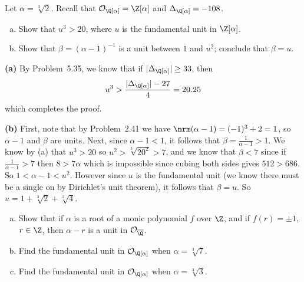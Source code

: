 \documentclass[11pt,letterpaper]{article}
\begin{document}
\begin{cproblem}{5.36}
    Let $\alpha=\sqrt[3]{2}$. Recall that $\mathcal{O}_{\Q[\alpha]}=\Z[\alpha]$ and $\Delta_{\Q[\alpha]}=-108$.
    \begin{enumerate}[(a)]
        \item Show that $u^3>20$, where $u$ is the fundamental unit in $\Z[\alpha]$.
        \item Show that $\beta = (\alpha -1)^{-1}$ is a unit between $1$ and $u^2$; conclude that $\beta = u$.
    \end{enumerate} 
\end{cproblem}
\begin{solution}
    \textbf{(a)} By Problem~5.35, we know that if $|\Delta_{\Q[\alpha]}|\geq 33$, then
    \[
        u^3>\frac{|\Delta_{\Q[\alpha]}|-27}{4} = 20.25
    \]
    which completes the proof.  
    
    \textbf{(b)} First, note that by Problem~2.41 we have $\nrm(\alpha-1)=(-1)^3+2=1$, so $\alpha-1$ and $\beta$ are units. Next, since $\alpha-1<1$, it follows that $\beta=\frac{1}{\alpha-1}>1$. We know by (a) that $u^3>20$ so $u^2>\sqrt[3]{20^2}>7$, and we know that $\beta < 7$ since if $\frac{1}{\alpha-1} > 7$ then $8 > 7\alpha$ which is impossible since cubing both sides gives $512 > 686$. So $1<\alpha-1<u^2$. However since $u$ is the fundamental unit (we know there must be a single on by Dirichlet's unit theorem), it follows that $\beta=u$. So $u=1+\sqrt[3]{2}+\sqrt[3]{4}$.   
\end{solution}

\begin{cproblem}{5.37}\noindent
    \begin{enumerate}[(a)]
        \item Show that if $\alpha$ is a root of a monic polynomial $f$ over $\Z$, and if $f(r)=\pm 1$, $r\in \Z$, then $\alpha-r$ is a unit in $\mathcal{O}_{\overline{\Q}}$. %
        \item Find the fundamental unit in $\mathcal{O}_{\Q[\alpha]}$ when $\alpha=\sqrt[3]{7}$. %
        \item Find the fundamental unit in $\mathcal{O}_{\Q[\alpha]}$ when $\alpha=\sqrt[3]{3}$. %
    \end{enumerate}
\end{cproblem}
\end{document}
